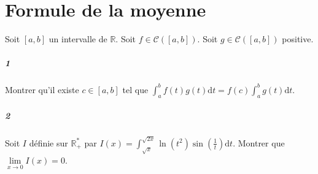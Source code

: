 \documentclass[10pt,a4paper]{article}
\begin{document}
\section{Formule de la moyenne}
Soit $[ a,b ]$ un intervalle de $\mathbb{R}$. Soit $f \in \mathcal{C}([a,b])$. Soit $g \in \mathcal{C}([a,b])$ positive.
\subparagraph{1}Montrer qu'il existe $c \in [a,b]$ tel que $\int_a^bf(t)g(t) \text{d}t=f(c) \int_a^b g(t) \text{d}t$.
\subparagraph{2}Soit $I$ définie sur $\mathbb{R}_+^*$ par $I(x)=\int_{\sqrt{x}}^{\sqrt{2x}} \ln(t^2) \sin(\frac{1}{t}) \text{d}t$. Montrer que $\underset{x \rightarrow 0}{\lim}I(x)=0$.
\end{document}
